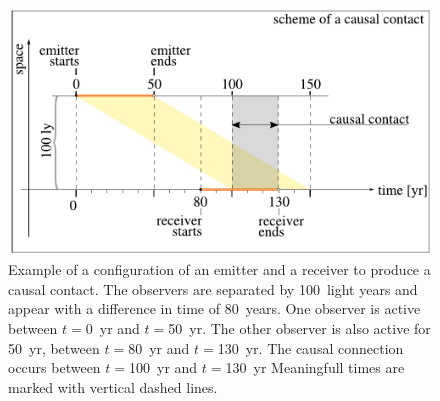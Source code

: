 \documentclass[crop]{CSLB}
\begin{document}
\begin{figure}[h]
%
\centering
%
\includegraphics[width=\columnwidth]{F_example.pdf}
%
\caption{Example of a configuration of an emitter and a receiver 
   to produce a causal contact.
   The observers are separated by 100~light years and appear with a
   difference in time of 80~years. One observer is active between
   $t=$0~yr and $t=$50~yr.  The other observer is also active for
   50~yr, between $t=$80~yr and $t=$130~yr. 
   The causal connection occurs between $t=$100~yr and $t=$130~yr
   Meaningfull times are marked with vertical dashed lines.
   }
%
\label{F_example}
%
\end{figure}
\end{document}
